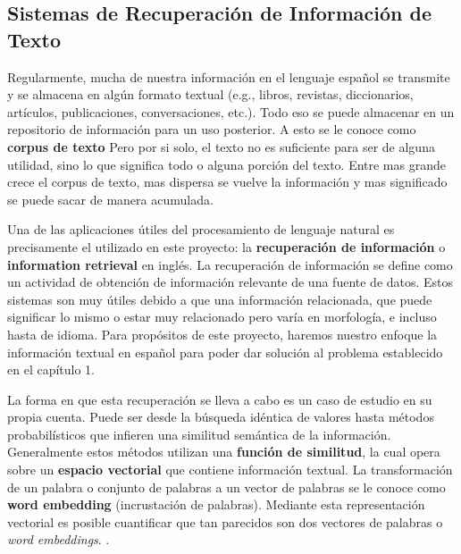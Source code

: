 \subsection{Sistemas de Recuperación de Información de Texto}

Regularmente, mucha de nuestra información en el lenguaje español se transmite y se almacena en algún formato textual (e.g., libros, revistas, diccionarios, artículos, publicaciones, conversaciones, etc.). Todo eso se puede almacenar en un repositorio de información para un uso posterior. A esto se le conoce como \textbf{corpus de texto} Pero por si solo, el texto no es suficiente para ser de alguna utilidad, sino lo que significa todo o alguna porción del texto. Entre mas grande crece el corpus de texto, mas dispersa se vuelve la información y mas significado se puede sacar de manera acumulada.

Una de las aplicaciones útiles del procesamiento de lenguaje natural es precisamente el utilizado en este proyecto: la \textbf{recuperación de información} o \textbf{information retrieval} en inglés. La recuperación de información se define como un actividad de obtención de información relevante de una fuente de datos. Estos sistemas son muy útiles debido a que una información relacionada, que puede significar lo mismo o estar muy relacionado pero varía en morfología, e incluso hasta de idioma. Para propósitos de este proyecto, haremos nuestro enfoque la información textual en español para poder dar solución al problema establecido en el capítulo 1.

La forma en que esta recuperación se lleva a cabo es un caso de estudio en su propia cuenta. Puede ser desde la búsqueda idéntica de valores hasta métodos probabilísticos que infieren una similitud semántica de la información. Generalmente estos métodos utilizan una \textbf{función de similitud}, la cual opera sobre un \textbf{espacio vectorial} que contiene información textual. La transformación de un palabra o conjunto de palabras a un vector de palabras se le conoce como \textbf{word embedding} (incrustación de palabras). Mediante esta representación vectorial es posible cuantificar que tan parecidos son dos vectores de palabras o \textit{word embeddings}. \parencite{zhaimassung}.

